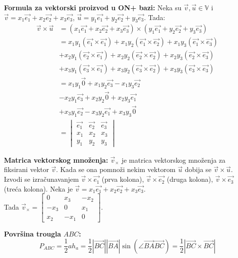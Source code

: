 \documentclass[12pt]{article}
\newcommand{\vek}[1]{\overrightarrow{#1}}
\begin{document}
\textbf{Formula za vektorski proizvod u ON+ bazi:} Neka su $\vek{v},\vek{u}\in
    \mathbb{V}$ i $\vek{v}=x_1\vek{e_1}+x_2\vek{e_2}+x_3\vek{e_3}$, $\vek{u}=
    y_1\vek{e_1}+y_2\vek{e_2}+y_3\vek{e_3}$. Tada:
\begin{align*}
    \vek{v}\times\vek{u} & = (x_1\vek{e_1}+x_2\vek{e_2}+x_3\vek{e_3})\times(y_1\vek{e_1}+y_2\vek{e_2}+y_3\vek{e_3})            \\
                         & =x_1y_1(\vek{e_1}\times\vek{e_1})+x_1y_2(\vek{e_1}\times\vek{e_2})+x_1y_3(\vek{e_1}\times\vek{e_3}) \\
                         & +x_2y_1(\vek{e_2}\times\vek{e_1})+x_2y_2(\vek{e_2}\times\vek{e_2})+x_2y_3(\vek{e_2}\times\vek{e_3}) \\
                         & +x_3y_1(\vek{e_3}\times\vek{e_1})+x_3y_2(\vek{e_3}\times\vek{e_2})+x_3y_3(\vek{e_3}\times\vek{e_3}) \\
                         & =x_1y_1\vek{0}+x_1y_2\vek{e_3}-x_1y_3\vek{e_2}                                                      \\
                         & -x_2y_1\vek{e_3}+x_2y_2\vek{0}+x_2y_3\vek{e_1}                                                      \\
                         & +x_3y_1\vek{e_2}-x_3y_2\vek{e_1}+x_3y_3\vek{0}                                                      \\
                         & = \begin{vmatrix}
                                 \vek{e_1} & \vek{e_2} & \vek{e_3} \\
                                 x_1       & x_2       & x_3       \\
                                 y_1       & y_2       & y_3
                             \end{vmatrix}
\end{align*}
\par

\textbf{Matrica vektorskog množenja:} $\vek{v}_\times$ je matrica vektorskog
množenja za fiksirani vektor $\vek{v}$. Kada se ona pomnoži nekim vektorom
$\vek{u}$ dobija se $\vek{v}\times\vek{u}$. Izvodi se izračunavanjem
$\vek{v}\times\vek{e_1}$ (prva kolona), $\vek{v}\times\vek{e_2}$
(druga kolona), $\vek{v}\times\vek{e_3}$ (treća kolona). Neka je
$\vek{v}=x_1\vek{e_1}+x_2\vek{e_2}+x_3\vek{e_3}$.\\
Tada  $\vek{v}_\times=
    \begin{bmatrix}
        0    & x_3  & -x_2 \\
        -x_3 & 0    & x_1  \\
        x_2  & -x_1 & 0
    \end{bmatrix}$.
\par
\textbf{Površina trougla $ABC$:}
$$P_{ABC}=\frac{1}{2}ah_a=\frac{1}{2} |\vek{BC}||\vek{BA}|\sin(\angle{\vek{BA}\vek{BC}})=\frac{1}{2} |\vek{BC}\times\vek{BC}|$$
\par
\end{document}
